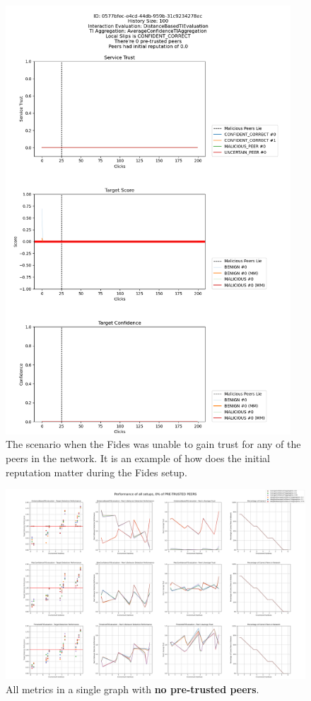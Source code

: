 \begin{figure}
    \centering
    \includegraphics[width=0.95\textwidth]{assets/zero_gained_trust_all.png}
    \caption{The scenario when the Fides was unable to gain trust for any of the peers in the network. It is an example of how does the initial reputation matter during the Fides setup.}
    \label{fig:zero-gained-trust-all}
\end{figure}

\begin{figure}
    \centering
    \includegraphics[width=0.94\paperwidth, angle=90]{assets/0_all_metrics.png}
    \caption{All metrics in a single graph with \textbf{no pre-trusted peers}.}
    \label{fig:performance-all-setups-0-pretrusted}
\end{figure}

